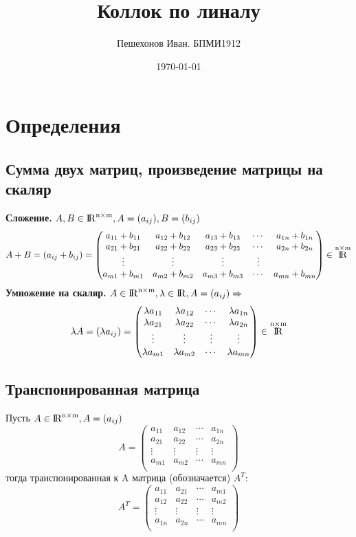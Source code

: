 \documentclass[a4paper,11pt]{report}
\title{Коллок по линалу}
\author{Пешехонов Иван. БПМИ1912}
\date{\today}
\DeclareMathOperator{\real}{\rm I\!R}
\DeclareMathOperator{\Mnm}{\real^{n\times m}}
\begin{document}
\maketitle %
\tableofcontents
\clearpage
\chapter{Определения}
\section{Сумма двух матриц, произведение матрицы на скаляр}
\textbf{Сложение.} $A, B \in \Mnm, A = (a_{ij}), B = (b_{ij}) $
\[
A + B = (a_{ij} + b_{ij}) = 
\begin{pmatrix}
a_{11} + b_{11} & a_{12} + b_{12} & a_{13} + b_{13} & \cdots & a_{1n} + b_{1n}\\
a_{21} + b_{21} & a_{22} + b_{22} & a_{23} + b_{23} & \cdots & a_{2n} + b_{2n}\\
\vdots & \vdots & \vdots & \vdots \\
a_{m1} + b_{m1} & a_{m2} + b_{m2} & a_{m3} + b_{m3} & \cdots & a_{mn} + b_{mn}\\
\end{pmatrix}
\in \Mnm
\]
\textbf{Умножение на скаляр.} $A \in \Mnm, \lambda \in \real, A = (a_{ij}) \Rightarrow$
\[
\lambda{A} = (\lambda{a_{ij}}) =
\begin{pmatrix}
\lambda{a_{11}} & \lambda{a_{12}} & \cdots & \lambda{a_{1n}}\\
\lambda{a_{21}} & \lambda{a_{22}} & \cdots & \lambda{a_{2n}}\\
\vdots & \vdots & \vdots & \vdots \\
\lambda{a_{m1}} & \lambda{a_{m2}} & \cdots & \lambda{a_{mn}}\\
\end{pmatrix}
\in \Mnm
\]
\section{Транспонированная матрица}
Пусть $A \in \Mnm, A = (a_{ij})$
\[
A =
\begin{pmatrix}
a_{11} & a_{12} & \cdots & a_{1n}\\
a_{21} & a_{22} & \cdots & a_{2n}\\
\vdots & \vdots & \vdots & \vdots\\
a_{m1} & a_{m2} & \cdots & a_{mn}\\
\end{pmatrix}
\]
тогда транспонированная к A матрица (обозначается) $A^T$:
\[
A^T = 
\begin{pmatrix}
a_{11} & a_{21} & \cdots & a_{m1}\\
a_{12} & a_{22} & \cdots & a_{m2}\\
\vdots & \vdots & \vdots & \vdots\\
a_{1n} & a_{2n} & \cdots & a_{mn}\\
\end{pmatrix}
\]
\end{document}
